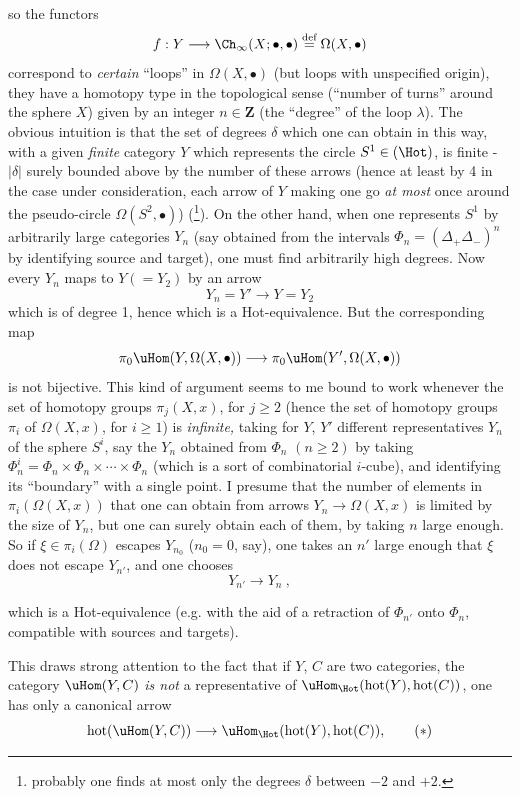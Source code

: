 \clearpage
{}

so the functors
\[ f : Y\longrightarrow \Ch_\infty(X;\bullet,\bullet) \overset{\text{def}}{=} \Omega(X,\bullet) \]
correspond to \textit{certain} ``loops'' in $\Omega(X,\bullet)$ (but loops with unspecified origin), they have a homotopy type in the topological sense (``number of turns'' around the sphere $X$) given by an integer $n\in\mathbf{Z}$ (the ``degree'' of the loop $\lambda$). The obvious intuition is that the set of degrees $\delta$ which one can obtain in this way, with a given \textit{finite} category $Y$ which represents the circle $S^1\in(\Hot)$, is finite - $|\delta|$ surely bounded above by the number of these arrows (hence at least by 4 in the case under consideration, each arrow of $Y$ making one go \textit{at most} once around the pseudo-circle $\Omega(S^2,\bullet)$) (\footnote[28]{probably one finds at most only the degrees $\delta$ between $-2$ and $+2$.}). On the other hand, when one represents $S^1$ by arbitrarily large categories $Y_n$ (say obtained from the intervals $\Phi_n=(\Delta_+\Delta_-)^n$ by identifying source and target), one must find arbitrarily high degrees. Now every $Y_n$ maps to $Y(=Y_2)$ by an arrow
\[ Y_n = Y' \longrightarrow Y = Y_2 \]
which is of degree 1, hence which is a Hot-equivalence. But the corresponding map
\[ \pi_0\uHom(Y,\Omega(X,\bullet)) \longrightarrow \pi_0\uHom(Y',\Omega(X,\bullet)) \]
is not bijective. This kind of argument seems to me bound to work whenever the set of homotopy groups $\pi_j(X,x)$, for $j\geq 2$ (hence the set of homotopy groups $\pi_i$ of $\Omega(X,x)$, for $i\geq 1$) is \textit{infinite,} taking for $Y$, $Y'$ different representatives $Y_n$ of the sphere $S^i$, say the $Y_n$ obtained from $\Phi_n$ $(n\geq 2)$ by taking $\Phi_n^i = \Phi_n\times\Phi_n\times\cdots\times\Phi_n$ (which is a sort of combinatorial $i$-cube), and identifying its ``boundary'' with a single point. I presume that the number of elements in $\pi_i(\Omega(X,x))$ that one can obtain from arrows $Y_n\longrightarrow\Omega(X,x)$ is limited by the size of $Y_n$, but one can surely obtain each of them, by taking $n$ large enough. So if $\xi\in\pi_i(\Omega)$ escapes $Y_{n_0}$ ($n_0=0$, say), one takes an $n'$ large enough that $\xi$ does not escape $Y_{n'}$, and one chooses %
\[ Y_{n'} \longrightarrow Y_n\ , \]


which is a Hot-equivalence (e.g. with the aid of a retraction of $\Phi_{n'}$ onto $\Phi_n$, compatible with sources and targets).

This draws strong attention to the fact that if $Y$, $C$ are two categories, the category $\uHom(Y,C)$ \textit{is not} a representative of $\uHom_{\Hot}(\mathrm{hot}(Y),\mathrm{hot}(C))$, one has only a canonical arrow
\[ \mathrm{hot}(\uHom(Y,C)) \longrightarrow \uHom_{\Hot}(\mathrm{hot}(Y),\mathrm{hot}(C)), \tag*{$(*)$} \]